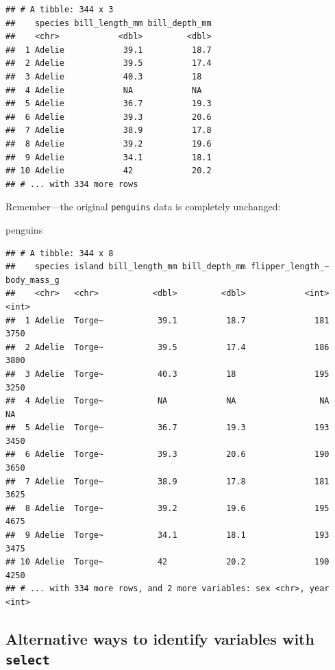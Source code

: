 \documentclass[
]{book}
\newenvironment{Shaded}{\begin{snugshade}}{\end{snugshade}}
\newcommand{\NormalTok}[1]{#1}
\begin{document}
\begin{verbatim}
## # A tibble: 344 x 3
##    species bill_length_mm bill_depth_mm
##    <chr>            <dbl>         <dbl>
##  1 Adelie            39.1          18.7
##  2 Adelie            39.5          17.4
##  3 Adelie            40.3          18  
##  4 Adelie            NA            NA  
##  5 Adelie            36.7          19.3
##  6 Adelie            39.3          20.6
##  7 Adelie            38.9          17.8
##  8 Adelie            39.2          19.6
##  9 Adelie            34.1          18.1
## 10 Adelie            42            20.2
## # ... with 334 more rows
\end{verbatim}

Remember---the original \texttt{penguins} data is completely unchanged:

\begin{Shaded}
\begin{Highlighting}[]
\NormalTok{penguins}
\end{Highlighting}
\end{Shaded}

\begin{verbatim}
## # A tibble: 344 x 8
##    species island bill_length_mm bill_depth_mm flipper_length_~ body_mass_g
##    <chr>   <chr>           <dbl>         <dbl>            <int>       <int>
##  1 Adelie  Torge~           39.1          18.7              181        3750
##  2 Adelie  Torge~           39.5          17.4              186        3800
##  3 Adelie  Torge~           40.3          18                195        3250
##  4 Adelie  Torge~           NA            NA                 NA          NA
##  5 Adelie  Torge~           36.7          19.3              193        3450
##  6 Adelie  Torge~           39.3          20.6              190        3650
##  7 Adelie  Torge~           38.9          17.8              181        3625
##  8 Adelie  Torge~           39.2          19.6              195        4675
##  9 Adelie  Torge~           34.1          18.1              193        3475
## 10 Adelie  Torge~           42            20.2              190        4250
## # ... with 334 more rows, and 2 more variables: sex <chr>, year <int>
\end{verbatim}

\hypertarget{alternative-ways-to-identify-variables-with-select}{%
\subsection{\texorpdfstring{Alternative ways to identify variables with \texttt{select}}{Alternative ways to identify variables with select}}\label{alternative-ways-to-identify-variables-with-select}}
\end{document}
